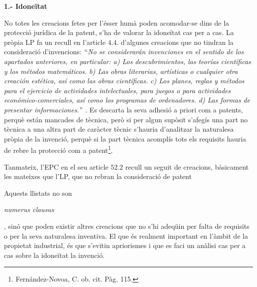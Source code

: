 \documentclass[12pt]{article}
\renewcommand{\_}{\kern-1.5pt\textunderscore\kern-1.5pt}
\begin{document}
\begin{itemize}
\vspace{\baselineskip}
\textbf{1.- Idoneïtat }\par

\setlength{\parskip}{9.0pt}
No totes les creacions fetes per l’ésser humà poden acomodar-se dins de la protecció jurídica de la patent, s’ha de valorar la idoneïtat cas per a cas. La pròpia LP fa un recull en l’article 4.4. d’algunes creacions que no tindran la consideració d’invencions: \textit{$``$No se considerarán invenciones en el sentido de los apartados anteriores, en particular: a) Los descubrimientos, las teorías científicas y los métodos matemáticos. b) Las obras literarias, artísticas o cualquier otra creación estética, así como las obras científicas. c) Los planes, reglas y métodos para el ejercicio de actividades intelectuales, para juegos o para actividades económico-comerciales, así como los programas de ordenadores. d) Las formas de presentar informaciones.$"$ }. Es descarta la seva adhesió a priori com a patents, perquè están mancades de tècnica, però si per algun supòsit s’afegís una part no tècnica a una altra part de caràcter tècnic s’hauria d’analitzar la naturalesa pròpia de la invenció, perquè si la part tècnica acomplís tots els requisits hauria de rebre la protecció com a patent\footnote{ Fernández-Novoa, C. ob. cit. Pàg. 115. }. \par


\vspace{\baselineskip}
Tanmateix, l’EPC en el seu article 52.2 recull un seguit de creacions, bàsicament les mateixes que l’LP, que no rebran la consideració de patent\par


\vspace{\baselineskip}
\begin{justify}
{\fontsize{11pt}{13.2pt}\selectfont Aquests llistats no son \par}\textit{numerus clausus}{\fontsize{11pt}{13.2pt}\selectfont , sinó que poden existir altres creacions que no s’hi adeqüin per falta de requisits o per la seva naturalesa inventiva. El que és realment important en l’àmbit de la propietat industrial, és que s’evitin apriorismes i que es faci un anàlisi cas per a cas sobre la idoneïtat la invenció. \par}
\end{justify}\par



\end{itemize}
\end{document}
